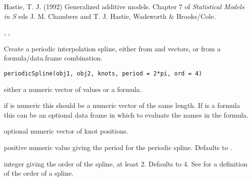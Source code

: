 %
\begin{References}\relax
Hastie, T. J. (1992)
Generalized additive models.
Chapter 7 of \emph{Statistical Models in S}
eds J. M. Chambers and T. J. Hastie, Wadsworth \& Brooks/Cole.
\end{References}
%
\begin{SeeAlso}\relax
{}, , 
\end{SeeAlso}
%
\begin{Examples}
\end{Examples}
%
\begin{Description}\relax
Create a periodic interpolation spline, either from  and
 vectors, or from a formula/data.frame combination.
\end{Description}
%
\begin{Usage}
\begin{verbatim}
periodicSpline(obj1, obj2, knots, period = 2*pi, ord = 4)
\end{verbatim}
\end{Usage}
%
\begin{Arguments}
\begin{ldescription}
\item[\code{obj1}] either a numeric vector of  values or a formula.
\item[\code{obj2}] if  is numeric this should be a numeric vector
of the same length.  If  is a formula this can be an
optional data frame in which to evaluate the names in the formula.
\item[\code{knots}] optional numeric vector of knot positions.
\item[\code{period}] positive numeric value giving the period for the
periodic spline.  Defaults to .
\item[\code{ord}] integer giving the order of the spline, at least 2.  Defaults
to 4.  See  for a definition of the order of
a spline.
\end{ldescription}
\end{Arguments}
